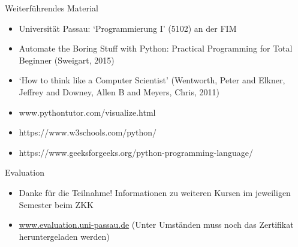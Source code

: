 \begin{frame}{Weiterführendes Material}
\begin{itemize}
    \item Universität Passau: `Programmierung I' (5102) an der FIM
    \item Automate the Boring Stuff with Python: Practical Programming for Total Beginner (Sweigart, 2015)
    \item `How to think like a Computer Scientist' (Wentworth, Peter and Elkner, Jeffrey and Downey, Allen B and Meyers, Chris, 2011) 
    \item www.pythontutor.com/visualize.html
    \item https://www.w3schools.com/python/
    \item https://www.geeksforgeeks.org/python-programming-language/
\end{itemize}
\end{frame}

\begin{frame}{Evaluation}
\begin{itemize}
    \item Danke für die Teilnahme! Informationen zu weiteren Kursen im jeweiligen Semester beim ZKK
    \item \url{www.evaluation.uni-passau.de} (Unter Umständen muss noch das Zertifikat
        heruntergeladen werden)
\end{itemize}
\end{frame}

